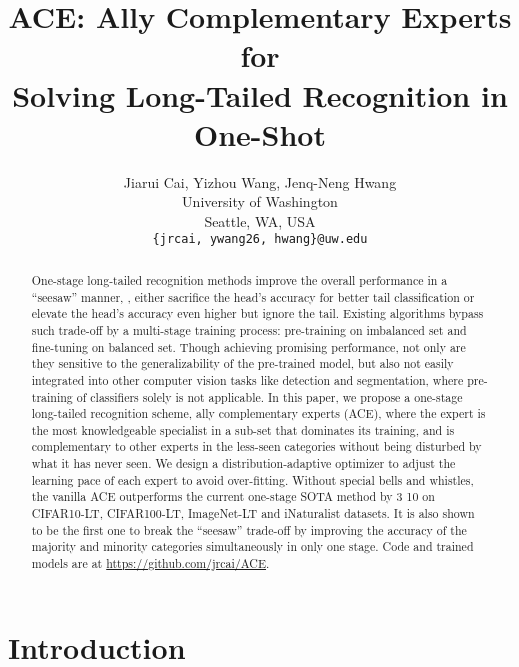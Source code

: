 \documentclass[10pt,twocolumn,letterpaper]{article}
\begin{document}
\title{ACE: Ally Complementary Experts for\\
Solving Long-Tailed Recognition in One-Shot}


\author{Jiarui Cai, Yizhou Wang, Jenq-Neng Hwang\\
University of Washington\\
Seattle, WA, USA\\
{\tt\small \{jrcai, ywang26, hwang\}@uw.edu}
}

\maketitle


\begin{abstract}
One-stage long-tailed recognition methods improve the overall performance in a ``seesaw'' manner, \ie, either sacrifice the head's accuracy for better tail classification or elevate the head's accuracy even higher but ignore the tail. Existing algorithms bypass such trade-off by a multi-stage training process: pre-training on imbalanced set and fine-tuning on balanced set. Though achieving promising performance, not only are they sensitive to the generalizability of the pre-trained model, but also not easily integrated into other computer vision tasks like detection and segmentation, where pre-training of classifiers solely is not applicable. In this paper, we propose a one-stage long-tailed recognition scheme,  ally complementary experts (ACE), where the expert is the most knowledgeable specialist in a sub-set that dominates its training, and is complementary to other experts in the less-seen categories without being disturbed by what it has never seen. We design a distribution-adaptive optimizer to adjust the learning pace of each expert to avoid over-fitting. Without special bells and whistles, the vanilla ACE outperforms the current one-stage SOTA method by 3 10 on CIFAR10-LT, CIFAR100-LT, ImageNet-LT and iNaturalist datasets. It is also shown to be the first one to break the ``seesaw'' trade-off by improving the accuracy of the majority and minority categories simultaneously in only one stage. Code and trained models are at \url{https://github.com/jrcai/ACE}. 
\end{abstract}

\section{Introduction}
\end{document}
